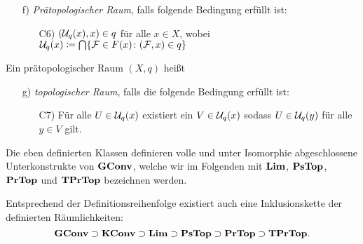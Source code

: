 \begin{defn}
\begin{enumerate}[a)]
\begin{enumerate}
      \end{enumerate}
    \item[f)] \emph{Prätopologischer Raum}, falls folgende Bedingung erfüllt ist:
      \begin{enumerate}
        \item[C6)] $(\mathcal{U}_q(x), x) \in q$ für alle $x \in X$, wobei $\mathcal{U}_q(x) \coloneqq \bigcap\{ \mathcal{F} \in F(x) \colon (\mathcal{F}, x) \in q\}$
      \end{enumerate}
  \end{enumerate}
  Ein prätopologischer Raum $(X,q)$ heißt 
  \begin{enumerate}[a)]
    \item[g)] \emph{topologischer Raum}, falls die folgende Bedingung erfüllt ist:
      \begin{enumerate}
        \item[C7)] Für alle $U \in \mathcal{U}_q(x)$ existiert ein $V \in \mathcal{U}_q(x)$ sodass $U \in \mathcal{U}_q(y)$ für alle $y \in V$ gilt.
      \end{enumerate}
  \end{enumerate}
\end{defn}

Die eben definierten Klassen definieren volle und unter Isomorphie abgeschlossene Unterkonstrukte von $\mathbf{GConv}$, welche wir im Folgenden mit $\mathbf{Lim}$, $\mathbf{PsTop}$, $\mathbf{PrTop}$ und $\mathbf{TPrTop}$ bezeichnen werden.

\begin{bem}
Entsprechend der Definitionsreihenfolge existiert auch eine Inklusionskette der definierten Räumlichkeiten:
  $$
  \mathbf{GConv} \supset \mathbf{KConv} \supset \mathbf{Lim} \supset \mathbf{PsTop} \supset \mathbf{PrTop} \supset \mathbf{TPrTop}.
  $$
\end{bem}

